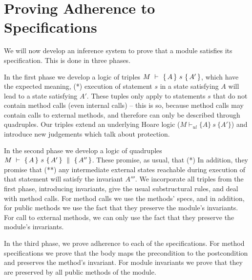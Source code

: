 \newcommand{\midcond}{midcondition\xspace}

\section{Proving Adherence to \SpecLang Specifications}
\label{sect:proofSystem}

We will now develop an inference system to prove that a module %
satisfies its specification. This is done in three phases.


In the first phase we develop a logic of triples ${M\ \vdash\ \{\,A\, \} \ s\  \{\,A'\, \} }$, which have the expected meaning, \ie 
(*) execution of statement $s$ in a state satisfying   $A$ will lead to a state satisfying    $A'$.
These tuples only apply to statements $s$ that  do not contain method calls  (even internal calls) -- this is so, because method calls may contain calls to external methods, and therefore can only be described through quadruples.
Our triples extend an underlying Hoare logic  (${M \vdash_{ul}  \{A\} {\ s\ } \{A'\} }$) and  introduce new judgements  which talk about protection.

In the second phase we develop a logic of quadruples ${M\ \vdash\ \{\,A\, \} \ s\  \{\,A'\, \}\, \,\parallel\,\, \{\, A'' \, \}}$. These promise, as usual, that (*) 
In addition, they promise that (**) any intermediate external states reachable during execution of that statement will satisfy the invariant  $A'''$.  
\sdN{We call $A''$ the \midcond.}
 We incorporate all triples from the first phase,       
introducing invariants, give the usual substructural rules, and deal with method calls. 
For method calls we use the methods' specs, and in addition, for public methods we use the fact that they preserve the module's invariants. 
For call to external  methods, we can only use the fact that they preserve the module's invariants. 
 
In the third phase, we prove adherence to each of the specifications. 
For method specifications we prove that the body maps the precondition to the postcondition and preserves the method's invariant. 
For module invariants we prove that they  are preserved by all public methods of the module.

